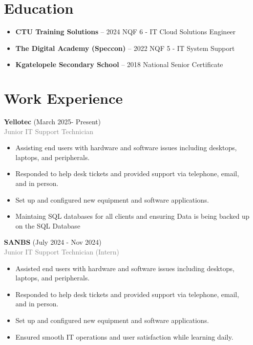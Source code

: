 \documentclass[a4paper,10pt]{article}
\begin{document}
\section{Education}
\begin{itemize}
    \item \textbf{CTU Training Solutions} – 2024 \newline
    NQF 6 - IT Cloud Solutions Engineer
    \item \textbf{The Digital Academy (Speccon)} – 2022 \newline
    NQF 5 - IT System Support
    \item \textbf{Kgatelopele Secondary School} – 2018 \newline
    National Senior Certificate
\end{itemize}

\section{Work Experience}

\textbf{Yellotec} (March 2025- Present)\\
\textcolor{gray}{Junior IT Support Technician}
\begin{itemize}
    \item Assisting end users with hardware and software issues including desktops, laptops, and peripherals.
    \item Responded to help desk tickets and provided support via telephone, email, and in person.
    \item Set up and configured new equipment and software applications.
    \item Maintaing SQL databases for all clients and ensuring Data is being backed up on the SQL Database
\end{itemize}


\textbf{SANBS} (July 2024 - Nov 2024)\\
\textcolor{gray}{Junior IT Support Technician (Intern)}
\begin{itemize}
    \item Assisted end users with hardware and software issues including desktops, laptops, and peripherals.
    \item Responded to help desk tickets and provided support via telephone, email, and in person.
    \item Set up and configured new equipment and software applications.
    \item Ensured smooth IT operations and user satisfaction while learning daily.
\end{itemize}
\end{document}
